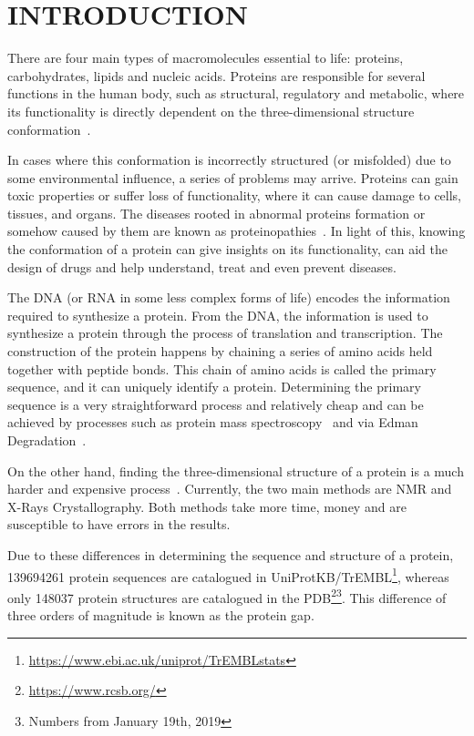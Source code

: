 \chapter{INTRODUCTION}\label{chap:introduction}

There are four main types of macromolecules essential to life:
proteins, carbohydrates, lipids and nucleic acids. Proteins are responsible for
several functions in the human body, such as structural, regulatory and
metabolic, where its functionality is directly dependent on the
three-dimensional structure conformation~\cite{kihara2014protein}.

In cases where this conformation is incorrectly structured (or misfolded) due to some environmental influence, a series of problems may arrive. Proteins can gain toxic properties or suffer loss of functionality, where it can cause damage to cells, tissues, and organs. The
diseases rooted in abnormal proteins formation or somehow
caused by them are known as proteinopathies~\cite{shrestha2015yeast}.
In light of this, knowing the conformation of a protein can give insights on its functionality, can aid the design of drugs and help understand, treat and even prevent diseases.

The \ac{DNA} (or \ac{RNA} in some less complex forms of life) encodes the information
required to synthesize a protein. From the \ac{DNA}, the information is used to
synthesize a protein through the process of translation and transcription. The
construction of the protein happens by chaining a series of amino acids held
together with peptide bonds. This chain of amino acids is called the primary
sequence, and it can uniquely identify a protein. Determining the primary
sequence is a very straightforward process and relatively cheap and can be
achieved by processes such as protein mass
spectroscopy~\cite{domon2006mass,covey1999protein}
and via Edman Degradation~\cite{edman1967protein}.

On the other hand, finding the three-dimensional structure of a protein is a
much harder and expensive process~\cite{guntert2004automated}.
Currently, the two main methods are
\ac{NMR} and X-Rays Crystallography. Both methods take more
time, money and are susceptible to have errors in the results.

Due to these differences in determining the sequence and structure of a
protein, \num{139694261} protein sequences are catalogued in
UniProtKB/TrEMBL\footnote{\url{https://www.ebi.ac.uk/uniprot/TrEMBLstats}},
whereas only \num{148037} protein structures are catalogued in
the \ac{PDB}\footnote{\url{https://www.rcsb.org/}}\footnote{Numbers from January 19th, 2019}.
This difference of three orders of magnitude is known as the protein gap.

